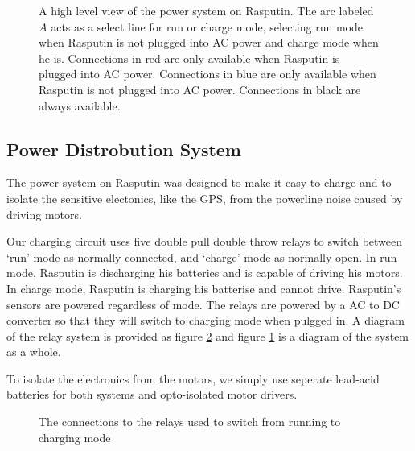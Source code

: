 \documentclass[master.tex]{subfiles}
\begin{document}
\begin{figure}
  
  \caption{A high level view of the power system on Rasputin.
    The arc labeled $A$ acts as a select line for run or charge mode, selecting run mode when Rasputin is not plugged into AC power and charge mode when he is.
    Connections in {\color{red} red} are only available when Rasputin is plugged into AC power.
    Connections in {\color{blue} blue} are only available when Rasputin is not plugged into AC power.
    Connections in black are always available.}
  \label{power-distrobution-diagram}
\end{figure}
\subsection{Power Distrobution System}
The power system on Rasputin was designed to make it easy to charge and to isolate the sensitive electonics, like the GPS, from the powerline noise caused by driving motors.

Our charging circuit uses five double pull double throw relays to switch between `run' mode as normally connected, and `charge' mode as normally open.
In run mode, Rasputin is discharging his batteries and is capable of driving his motors.
In charge mode, Rasputin is charging his batterise and cannot drive.
Rasputin's sensors are powered regardless of mode.
The relays are powered by a AC to DC converter so that they will switch to charging mode when pulgged in.
A diagram of the relay system is provided as figure \ref{relay-diagram} and figure \ref{power-distrobution-diagram} is a diagram of the system as a whole.

To isolate the electronics from the motors, we simply use seperate lead-acid batteries for both systems and opto-isolated motor drivers.
\begin{figure}
  
  \caption{The connections to the relays used to switch from running to charging mode}
  \label{relay-diagram}
\end{figure}
\end{document}
